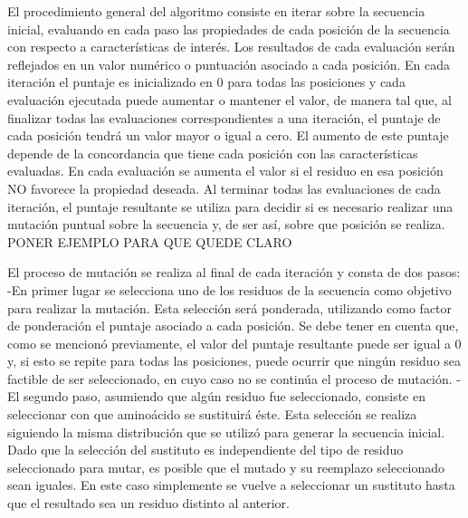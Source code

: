 

El procedimiento general del algoritmo consiste en iterar sobre la secuencia inicial, evaluando en cada paso las propiedades de cada posición de la secuencia con respecto a características de interés. 
Los resultados de cada evaluación serán reflejados en un valor numérico o puntuación asociado a cada posición. En cada iteración el puntaje es inicializado en 0 para todas las posiciones y cada evaluación ejecutada puede aumentar o mantener el valor, de manera tal que, al finalizar todas las evaluaciones correspondientes a una iteración, el puntaje de cada posición tendrá un valor mayor o igual a cero. 
El aumento de este puntaje depende de la concordancia que tiene cada posición con las características evaluadas. En cada evaluación se aumenta el valor si el residuo en esa posición NO favorece la propiedad deseada.
Al terminar todas las evaluaciones de cada iteración, el puntaje resultante se utiliza para decidir si es necesario realizar una mutación puntual sobre la secuencia y, de ser así, sobre que posición se realiza.
PONER EJEMPLO PARA QUE QUEDE CLARO

El proceso de mutación se realiza al final de cada iteración y consta de dos pasos:
    -En primer lugar se selecciona uno de los residuos de la secuencia como objetivo para realizar la mutación. Esta selección será ponderada, utilizando como factor de ponderación el puntaje asociado a cada posición. Se debe tener en cuenta que, como se mencionó previamente, el valor del puntaje resultante puede ser igual a 0 y, si esto se repite para todas las posiciones, puede ocurrir que ningún residuo sea factible de ser seleccionado, en cuyo caso no se continúa el proceso de mutación. 
    -El segundo paso, asumiendo que algún residuo fue seleccionado, consiste en seleccionar con que aminoácido se sustituirá éste. Esta selección se realiza siguiendo la misma distribución que se utilizó para generar la secuencia inicial. Dado que la selección del sustituto es independiente del tipo de residuo seleccionado para mutar, es posible que el mutado y su reemplazo seleccionado sean iguales. En este caso simplemente se vuelve a seleccionar un sustituto hasta que el resultado sea un residuo distinto al anterior.     

